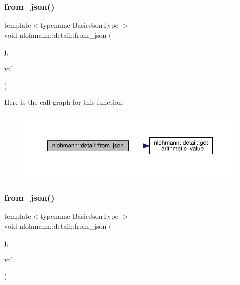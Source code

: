 \subsubsection{\texorpdfstring{from\_json()}{from\_json()}\hspace{0.1cm}{\footnotesize\ttfamily [4/11]}}
{\footnotesize\ttfamily template$<$typename Basic\+Json\+Type $>$ \\
void nlohmann\+::detail\+::from\+\_\+json (\begin{DoxyParamCaption}\item[{const Basic\+Json\+Type \&}]{j,  }\item[{typename Basic\+Json\+Type\+::number\+\_\+unsigned\+\_\+t \&}]{val }\end{DoxyParamCaption})}

Here is the call graph for this function\+:\nopagebreak
\begin{figure}[H]
\begin{center}
\leavevmode
\includegraphics[width=350pt]{namespacenlohmann_1_1detail_ace4d5680ba413d9fd897ccb5d9c61a1c_cgraph}
\end{center}
\end{figure}
\mbox{\label{namespacenlohmann_1_1detail_a047d881e611fcac709dc318f730a1732}} 
\subsubsection{\texorpdfstring{from\_json()}{from\_json()}\hspace{0.1cm}{\footnotesize\ttfamily [5/11]}}
{\footnotesize\ttfamily template$<$typename Basic\+Json\+Type $>$ \\
void nlohmann\+::detail\+::from\+\_\+json (\begin{DoxyParamCaption}\item[{const Basic\+Json\+Type \&}]{j,  }\item[{typename Basic\+Json\+Type\+::number\+\_\+integer\+\_\+t \&}]{val }\end{DoxyParamCaption})}

